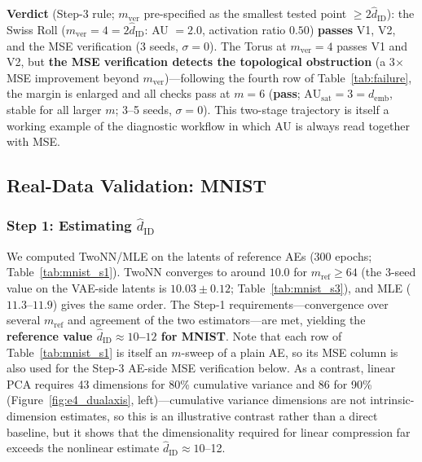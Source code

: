\documentclass[make,article,submit,pdftex,moreauthors]{Definitions/mdpi}
\newcommand{\hatdID}{\hat{d}_{\mathrm{ID}}}
\newcommand{\AUsat}{\mathrm{AU}_{\mathrm{sat}}}
\newcommand{\demb}{d_{\mathrm{emb}}}
\begin{document}
\textbf{Verdict} (Step-3 rule; $m_{\mathrm{ver}}$ pre-specified as the
smallest tested point $\geq 2\hatdID$): the Swiss Roll
($m_{\mathrm{ver}} = 4 = 2\hatdID$: AU $= 2.0$, activation ratio $0.50$)
\textbf{passes} V1, V2, and the MSE verification (3 seeds, $\sigma = 0$).
The Torus at $m_{\mathrm{ver}} = 4$ passes V1 and V2, but \textbf{the MSE
verification detects the topological obstruction} (a 3$\times$ MSE
improvement beyond $m_{\mathrm{ver}}$)---following the fourth row of
Table~\ref{tab:failure}, the margin is enlarged and all checks pass at
$m = 6$ (\textbf{pass}; $\AUsat = 3 = \demb$, stable for all larger $m$;
3--5 seeds, $\sigma = 0$).
This two-stage trajectory is itself a working example of the diagnostic
workflow in which AU is always read together with MSE.

\subsection{Real-Data Validation: MNIST}\label{sec:exp_mnist}

\subsubsection{Step 1: Estimating $\hatdID$}

We computed TwoNN/MLE on the latents of reference AEs (300 epochs;
Table~\ref{tab:mnist_s1}).
TwoNN converges to around $10.0$ for $m_{\mathrm{ref}} \geq 64$
(the 3-seed value on the VAE-side latents is $10.03 \pm 0.12$;
Table~\ref{tab:mnist_s3}), and MLE
($11.3$--$11.9$) gives the same order.
The Step-1 requirements---convergence over several $m_{\mathrm{ref}}$ and
agreement of the two estimators---are met, yielding the
\textbf{reference value $\hatdID \approx 10$--$12$ for MNIST}.
Note that each row of Table~\ref{tab:mnist_s1} is itself an $m$-sweep of a
plain AE, so its MSE column is also used for the Step-3 AE-side MSE
verification below.
As a contrast, linear PCA requires 43 dimensions for 80\% cumulative
variance and 86 for 90\% (Figure~\ref{fig:e4_dualaxis}, left)---cumulative
variance dimensions are not intrinsic-dimension estimates, so this is an
illustrative contrast rather than a direct baseline, but it shows that the
dimensionality required for linear compression far exceeds the nonlinear
estimate $\hatdID \approx 10$--12.
\end{document}
